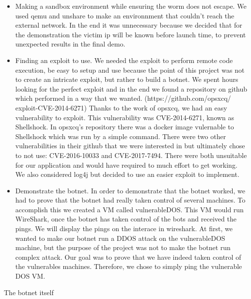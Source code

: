 \documentclass[../main.tex]{subfiles}
\begin{document}
    \begin{itemize}

        \item Making a sandbox environment while ensuring the worm does not escape.
        We used qemu and unshare to make an environnment that couldn't reach the external network.
        In the end it was unnecessary because we decided that for the demonstration the victim ip will be known before launch time, to prevent unexpected results in the final demo. 

        \item Finding an exploit to use.
        We needed the exploit to perform remote code execution, be easy to setup and use because the point of this project was not to create an intricate exploit, but rather to build a botnet.
        We spent hours looking for the perfect exploit and in the end we found a repository on github which performed in a way that we wanted.
        (https://github.com/opsxcq/
        exploit-CVE-2014-6271)
        Thanks to the work of opsxcq, we had an easy vulnerability to exploit.
        This vulnerability was CVE-2014-6271, known as Shellshock.
        In opsxcq's repository there was a docker image vulernable to Shellshock which was run by a simple command.
        There were two other vulnerabilities in their github that we were interested in but ultimately chose to not use: CVE-2016-10033 and CVE-2017-7494.
        There were both unsuitable for our application and would have required to much effort to get working. 
        We also considered log4j but decided to use an easier exploit to implement.

        \item Demonstrate the botnet.
        In order to demonstrate that the botnet worked, we had to prove that the botnet had really taken control of several machines.
        To accomplish this we created a VM called vulnerableDOS. This VM would run WireShark, once the botnet has taken control of the bots and received the pings. We will display the pings on the interace in wireshark.
        At first, we wanted to make our botnet run a DDOS attack on the vulnerableDOS machine, but the purpose of the project was not to make the botnet run complex attack. Our goal was to prove that we have indeed taken control of the vulnerables machines. Therefore, we chose to simply ping the vulnerable DOS VM.

    \end{itemize}

    The botnet itself 
\end{document}
